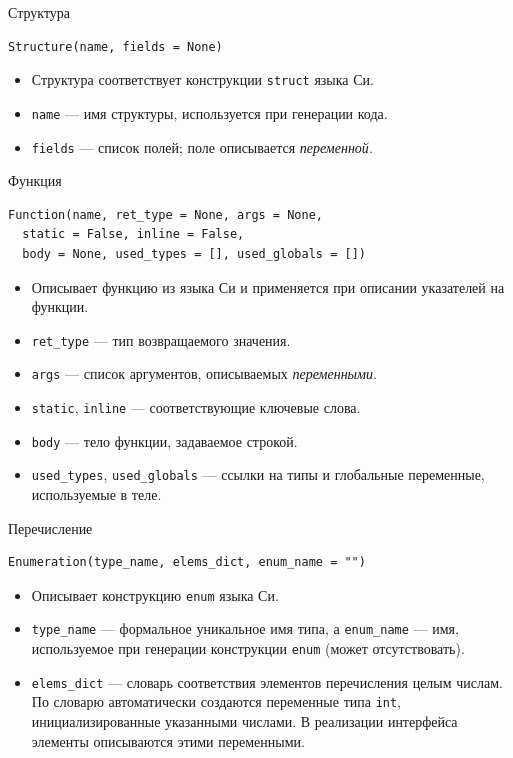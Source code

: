 \documentclass[unicode,hyperref={unicode=true}]{beamer}
\theoremstyle{definition}
\theoremstyle{plain}
\begin{document}
\begin{frame}[fragile]{Структура}
\lstset{language=Python}
\begin{lstlisting}
Structure(name, fields = None)
\end{lstlisting}
\vfill
\begin{itemize}
\item Структура соответствует конструкции \texttt{struct} языка Си.
\item \texttt{name} --- имя структуры, используется при генерации кода.
\item \texttt{fields} --- список полей; поле описывается \textit{переменной}.
\end{itemize}
\end{frame}



\begin{frame}[fragile]{Функция}
\lstset{language=Python}
\begin{lstlisting}
Function(name, ret_type = None, args = None,
  static = False, inline = False,
  body = None, used_types = [], used_globals = [])
\end{lstlisting}
\vfill
\begin{itemize}
\item Описывает функцию из языка Си и применяется при описании указателей на
    функции.
\item \texttt{ret\_type} --- тип возвращаемого значения.
\item \texttt{args} --- список аргументов, описываемых \textit{переменными}.
\item \texttt{static}, \texttt{inline} --- соответствующие ключевые слова.
\item \texttt{body} --- тело функции, задаваемое строкой.
\item \texttt{used\_types}, \texttt{used\_globals} --- ссылки на типы и
    глобальные переменные, используемые в теле.
\end{itemize}
\end{frame}



\begin{frame}[fragile]{Перечисление}
\lstset{language=Python}
\begin{lstlisting}
Enumeration(type_name, elems_dict, enum_name = "")
\end{lstlisting}
\vfill
\begin{itemize}
\item Описывает конструкцию \texttt{enum} языка Си.
\item \texttt{type\_name} --- формальное уникальное имя типа, а
    \texttt{enum\_name} --- имя, используемое при генерации конструкции
    \texttt{enum} (может отсутствовать).
\item \texttt{elems\_dict} --- словарь соответствия элементов перечисления
    целым числам. По словарю автоматически создаются переменные типа
    \texttt{int}, инициализированные указанными числами. В реализации
    интерфейса элементы описываются этими переменными.
\end{itemize}
\end{frame}
\end{document}
